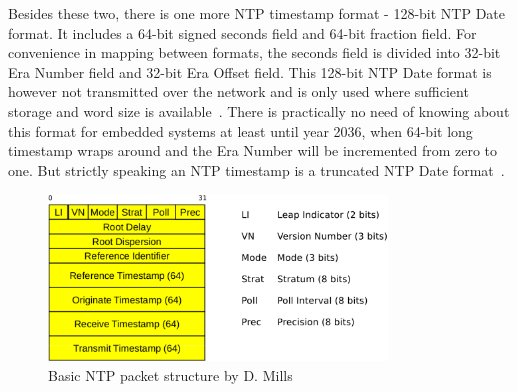 Besides these two, there is one more NTP timestamp format - 128-bit NTP Date format.
It includes a 64-bit signed seconds field and 64-bit fraction field.
For convenience in mapping between formats,
the seconds field is divided into 32-bit Era Number field
and 32-bit Era Offset field.
This 128-bit NTP Date format is however not transmitted over the network
and is only used where sufficient storage and word size is available~\cite{rfc5905}.
There is practically no need of knowing about this format for embedded systems
at least until year 2036, when 64-bit long timestamp wraps around and
the Era Number will be incremented from zero to one.
But strictly speaking an NTP timestamp is a truncated NTP Date format~\cite{rfc5905}.

\begin{figure}
	\centering
	\includegraphics[width=9cm,keepaspectratio]{fig/ntp-packet.pdf}
	\caption{Basic NTP packet structure by D. Mills}
	\label{fig:ntp-packet}
	\bigskip
\end{figure}

